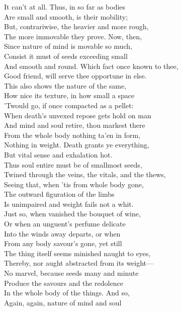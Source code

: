It can't at all. Thus, in so far as bodies\\
Are small and smooth, is their mobility;\\
But, contrariwise, the heavier and more rough,\\
The more immovable they prove. Now, then,\\
Since nature of mind is movable so much,\\
Consist it must of seeds exceeding small\\
And smooth and round. Which fact once known to thee,\\
Good friend, will serve thee opportune in else.\\
This also shows the nature of the same,\\
How nice its texture, in how small a space\\
'Twould go, if once compacted as a pellet:\\
When death's unvexed repose gets hold on man\\
And mind and soul retire, thou markest there\\
From the whole body nothing ta'en in form,\\
Nothing in weight. Death grants ye everything,\\
But vital sense and exhalation hot.\\
Thus soul entire must be of smallmost seeds,\\
Twined through the veins, the vitals, and the thews,\\
Seeing that, when 'tis from whole body gone,\\
The outward figuration of the limbs\\
Is unimpaired and weight fails not a whit.\\
Just so, when vanished the bouquet of wine,\\
Or when an unguent's perfume delicate\\
Into the winds away departs, or when\\
From any body savour's gone, yet still\\
The thing itself seems minished naught to eyes,\\
Thereby, nor aught abstracted from its weight—\\
No marvel, because seeds many and minute\\
Produce the savours and the redolence\\
In the whole body of the things. And so,\\
Again, again, nature of mind and soul\\
